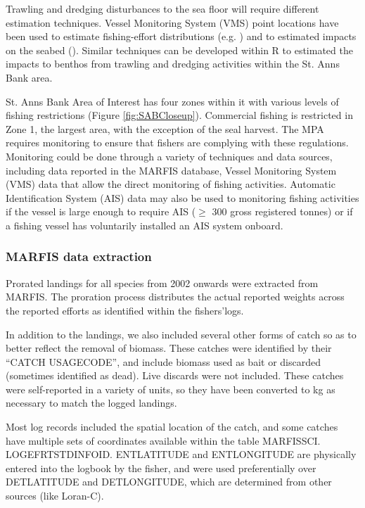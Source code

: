 \documentclass[letterpaper,portrait,11pt]{scrartcl}
\numberwithin{equation}{section}		%
\numberwithin{figure}{section}		%
\numberwithin{table}{section}				%
\begin{document}
Trawling and dredging disturbances to the sea floor will require different estimation techniques.  Vessel Monitoring System (VMS) point locations have been used to estimate fishing-effort distributions (e.g. \textcite{lee2010developing}) and to estimated impacts on the seabed (\textcite{gerritsen2013much}).  Similar techniques can be developed within R to estimated the impacts to benthos from trawling and dredging activities within the St. Anns Bank area.   


St. Anns Bank Area of Interest has four zones within it with various levels of fishing restrictions (Figure \ref{fig:SABCloseup}). Commercial fishing is restricted in Zone 1, the largest area, with the exception of the seal harvest.  The MPA requires monitoring to ensure that fishers are complying with these regulations.  Monitoring could be done through a variety of techniques and data sources, including data reported in the MARFIS database, Vessel Monitoring System (VMS) data that allow the direct monitoring of fishing activities. Automatic Identification System (AIS) data may also be used to monitoring fishing activities if the vessel is large enough to require AIS ($\geq$ 300 gross registered tonnes) or if a fishing vessel has voluntarily installed an AIS system onboard.  


\subsubsection{MARFIS data extraction}

Prorated landings for all species from 2002 onwards were extracted from MARFIS. The proration process distributes the actual reported weights across the reported efforts as identified within the fishers\textquoteright logs.  

In addition to the landings, we also included several other forms of catch so as to better reflect the removal of biomass. These catches were identified by their \textquotedblleft CATCH \textunderscore USAGE\textunderscore CODE\textquotedblright, and include biomass used as bait or discarded (sometimes identified as dead).  Live discards were not included.  These catches were self-reported in a variety of units, so they have been converted to kg as necessary to match the logged landings. 

Most log records included the spatial location of the catch, and some catches have multiple sets of coordinates available within the table MARFISSCI. LOG\textunderscore EFRT\textunderscore STD\textunderscore INFO\textunderscore ID.  ENT\textunderscore LATITUDE and ENT\textunderscore LONGITUDE are physically entered into the logbook by the fisher, and were used preferentially over DET\textunderscore LATITUDE  and DET\textunderscore LONGITUDE, which are determined from other sources (like Loran-C).  
\end{document}
